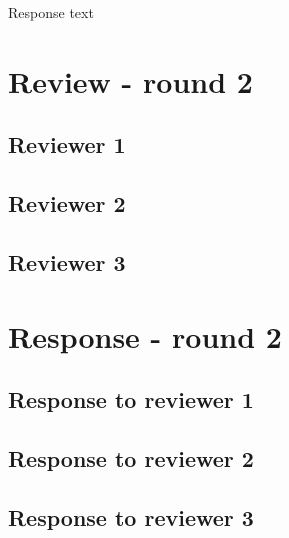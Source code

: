 \documentclass[
  manuscript=editorial,
  layout=publish,
  year=20xx,
  volume=x,
]{extra/review}
\begin{document}
\begin{response}
Response text
\end{response}


\section{Review - round 2}

\subsection{Reviewer 1}
\subsection{Reviewer 2}
\subsection{Reviewer 3}

\section{Response - round 2}

\subsection{Response to reviewer 1}
\subsection{Response to reviewer 2}
\subsection{Response to reviewer 3}
\end{document}
